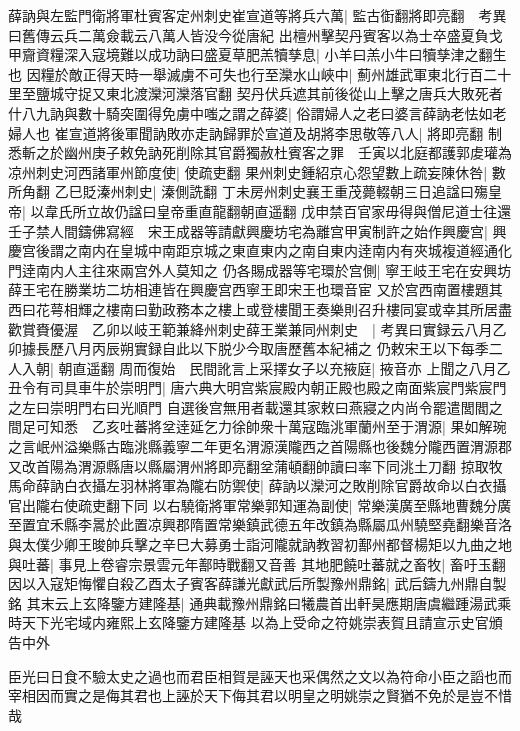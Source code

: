 薛訥與左監門衛將軍杜賓客定州刺史崔宣道等將兵六萬|{
	監古衘翻將即亮翻　考異曰舊傳云兵二萬僉載云八萬人皆没今從唐紀}
出檀州擊契丹賓客以為士卒盛夏負戈甲齎資糧深入寇境難以成功訥曰盛夏草肥羔犢孳息|{
	小羊曰羔小牛曰犢孳津之翻生也}
因糧於敵正得天時一舉滅虜不可失也行至灤水山峽中|{
	薊州雄武軍東北行百二十里至鹽城守捉又東北渡灤河灤落官翻}
契丹伏兵遮其前後從山上擊之唐兵大敗死者什八九訥與數十騎突圍得免虜中嗤之謂之薛婆|{
	俗謂婦人之老曰婆言薛訥老怯如老婦人也}
崔宣道將後軍聞訥敗亦走訥歸罪於宣道及胡將李思敬等八人|{
	將即亮翻}
制悉斬之於幽州庚子敕免訥死削除其官爵獨赦杜賓客之罪　壬寅以北庭都護郭䖍瓘為凉州刺史河西諸軍州節度使|{
	使疏吏翻}
果州刺史鍾紹京心怨望數上疏妄陳休咎|{
	數所角翻}
乙巳貶溱州刺史|{
	溱側詵翻}
丁未房州刺史襄王重茂薨輟朝三日追諡曰殤皇帝|{
	以韋氏所立故仍諡曰皇帝重直龍翻朝直遥翻}
戊申禁百官家毋得與僧尼道士往還壬子禁人間鑄佛寫經　宋王成器等請獻興慶坊宅為離宫甲寅制許之始作興慶宫|{
	興慶宫後謂之南内在皇城中南距京城之東直東内之南自東内逹南内有夾城複道經通化門逹南内人主往來兩宫外人莫知之}
仍各賜成器等宅環於宫側|{
	寧王岐王宅在安興坊薛王宅在勝業坊二坊相連皆在興慶宫西寧王即宋王也環音宦}
又於宫西南置樓題其西曰花萼相輝之樓南曰勤政務本之樓上或登樓聞王奏樂則召升樓同宴或幸其所居盡歡賞賚優渥　乙卯以岐王範兼絳州刺史薛王業兼同州刺史　|{
	考異曰實録云八月乙卯據長歷八月丙辰朔實録自此以下脱少今取唐歷舊本紀補之}
仍敕宋王以下每季二人入朝|{
	朝直遥翻}
周而復始　民間訛言上采擇女子以充掖庭|{
	掖音亦}
上聞之八月乙丑令有司具車牛於崇明門|{
	唐六典大明宫紫宸殿内朝正殿也殿之南面紫宸門紫宸門之左曰崇明門右曰光順門}
自選後宫無用者載還其家敕曰燕寢之内尚令罷遣閭閻之間足可知悉　乙亥吐蕃將坌逹延乞力徐帥衆十萬寇臨洮軍蘭州至于渭源|{
	果如解琬之言岷州溢樂縣古臨洮縣義寧二年更名渭源漢隴西之首陽縣也後魏分隴西置渭源郡又改首陽為渭源縣唐以縣屬渭州將即亮翻坌蒲頓翻帥讀曰率下同洮土刀翻}
掠取牧馬命薛訥白衣攝左羽林將軍為隴右防禦使|{
	薛訥以灤河之敗削除官爵故命以白衣攝官出隴右使疏吏翻下同}
以右驍衛將軍常樂郭知運為副使|{
	常樂漢廣至縣地曹魏分廣至置宜禾縣李暠於此置凉興郡隋置常樂鎮武德五年改鎮為縣屬瓜州驍堅堯翻樂音洛}
與太僕少卿王晙帥兵擊之辛巳大募勇士詣河隴就訥教習初鄯州都督楊矩以九曲之地與吐蕃|{
	事見上卷睿宗景雲元年鄯時戰翻又音善}
其地肥饒吐蕃就之畜牧|{
	畜吁玉翻}
因以入寇矩悔懼自殺乙酉太子賓客薛謙光獻武后所製豫州鼎銘|{
	武后鑄九州鼎自製銘}
其末云上玄降鑒方建隆基|{
	通典載豫州鼎銘曰犧農首出軒昊應期唐虞繼踵湯武乘時天下光宅域内雍熙上玄降鑒方建隆基}
以為上受命之符姚崇表賀且請宣示史官頒告中外

臣光曰日食不驗太史之過也而君臣相賀是誣天也采偶然之文以為符命小臣之謟也而宰相因而實之是侮其君也上誣於天下侮其君以明皇之明姚崇之賢猶不免於是豈不惜哉

